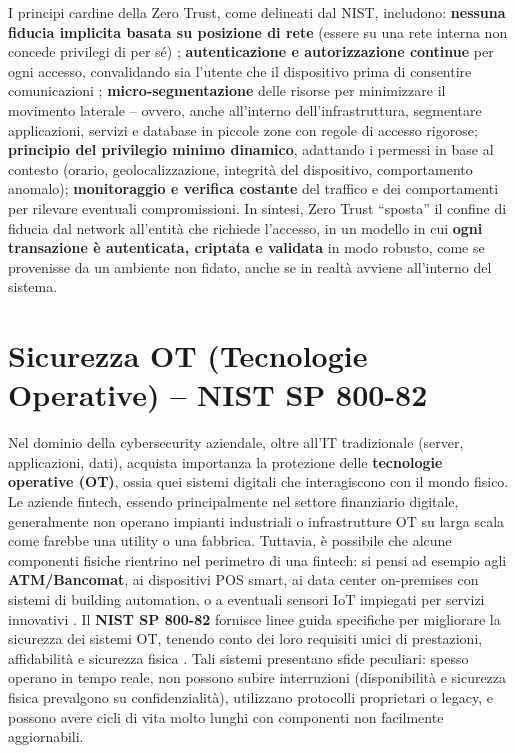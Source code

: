 \documentclass[a4paper,12pt]{report}
\begin{document}
I principi cardine della Zero Trust, come delineati dal NIST, includono: \textbf{nessuna fiducia implicita basata su posizione di rete} (essere su una rete interna non concede privilegi di per sé) \cite{nistZeroTrust}; \textbf{autenticazione e autorizzazione continue} per ogni accesso, convalidando sia l’utente che il dispositivo prima di consentire comunicazioni \cite{nistZeroTrust}; \textbf{micro-segmentazione} delle risorse per minimizzare il movimento laterale – ovvero, anche all’interno dell’infrastruttura, segmentare applicazioni, servizi e database in piccole zone con regole di accesso rigorose; \textbf{principio del privilegio minimo dinamico}, adattando i permessi in base al contesto (orario, geolocalizzazione, integrità del dispositivo, comportamento anomalo); \textbf{monitoraggio e verifica costante} del traffico e dei comportamenti per rilevare eventuali compromissioni. In sintesi, Zero Trust “sposta” il confine di fiducia dal network all’entità che richiede l’accesso, in un modello in cui \textbf{ogni transazione è autenticata, criptata e validata} in modo robusto, come se provenisse da un ambiente non fidato, anche se in realtà avviene all’interno del sistema.

\section{Sicurezza OT (Tecnologie Operative) – NIST SP 800-82}
\label{sec:sicurezza_ot}
Nel dominio della cybersecurity aziendale, oltre all’IT tradizionale (server, applicazioni, dati), acquista importanza la protezione delle \textbf{tecnologie operative (OT)}, ossia quei sistemi digitali che interagiscono con il mondo fisico. Le aziende fintech, essendo principalmente nel settore finanziario digitale, generalmente non operano impianti industriali o infrastrutture OT su larga scala come farebbe una utility o una fabbrica. Tuttavia, è possibile che alcune componenti fisiche rientrino nel perimetro di una fintech: si pensi ad esempio agli \textbf{ATM/Bancomat}, ai dispositivi POS smart, ai data center on-premises con sistemi di building automation, o a eventuali sensori IoT impiegati per servizi innovativi \cite{nistSP80082}. Il \textbf{NIST SP 800-82} fornisce linee guida specifiche per migliorare la sicurezza dei sistemi OT, tenendo conto dei loro requisiti unici di prestazioni, affidabilità e sicurezza fisica \cite{nistSP80082}. Tali sistemi presentano sfide peculiari: spesso operano in tempo reale, non possono subire interruzioni (disponibilità e sicurezza fisica prevalgono su confidenzialità), utilizzano protocolli proprietari o legacy, e possono avere cicli di vita molto lunghi con componenti non facilmente aggiornabili.
\end{document}
